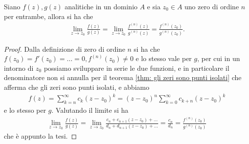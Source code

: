 \begin{theorem}[ di de l'Hôpital ]
  Siano $ f(z), g(z) $ analitiche in un dominio $ A $ e sia $ z_0 \in A $ uno zero di ordine $ n $ per entrambe, allora si ha che 
  \begin{align}
    \lim_{z \to z_0} \frac{f(z)}{g(z)} = \lim_{z \to z_0} \frac{f^{(n)}(z)}{g^{(n)}(z)} = \frac{f^{(n)}(z_0)}{g^{(n)}(z_0)}.
  \end{align}
\end{theorem}
\begin{proof}
  Dalla definizione di zero di ordine $ n $ si ha che $ f(z_0) = f'(z_0) = \dots = 0 , f^{(n)}(z_0) \neq 0 $ e lo stesso vale per $ g $, per cui in un 
  intorno di $ z_0 $ possiamo sviluppare in serie le due funzioni, e in particolare il denominatore non si annulla per il teorema 
  \ref{thm: gli zeri sono punti isolati} che afferma che gli zeri sono punti isolati, e abbiamo 
  \begin{align}
    f(z) = \sum_{k = n}^\infty c_k (z - z_0)^k = (z - z_0)^n \sum_{k = 0}^\infty c_{k + n} (z - z_0)^{k}
  \end{align}
  e lo stesso per $ g $. Valutando il limite si ha
  \begin{align}
    \lim_{z \to z_0} \frac{f(z)}{g(z)} = \lim_{z \to z_0} \frac{c_{n} + c_{n+1}(z - z_0) + \dots}{d_{n} + d_{n+1}(z - z_0) + \dots} = \frac{c_n}{d_n} 
    = \frac{f^{(n)}(z_0)}{g^{(n)}(z_0)}
  \end{align}
  che è appunto la tesi.
\end{proof}

